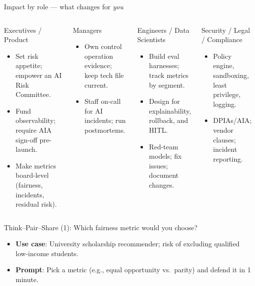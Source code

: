 \documentclass[11pt,aspectratio=169]{beamer}
\begin{document}
\begin{frame}{Impact by role — what changes for \emph{you}}
\begin{columns}[T,onlytextwidth]
\begin{block}{Executives / Product}
\begin{itemize}
  \item Set risk appetite; empower an AI Risk Committee.
  \item Fund observability; require AIA sign-off pre-launch.
  \item Make metrics board-level (fairness, incidents, residual risk).
\end{itemize}
\end{block}
\begin{block}{Managers}
\begin{itemize}
  \item Own control operation evidence; keep tech file current.
  \item Staff on-call for AI incidents; run postmortems.
\end{itemize}
\end{block}
\begin{block}{Engineers / Data Scientists}
\begin{itemize}
  \item Build eval harnesses; track metrics by segment.
  \item Design for explainability, rollback, and HITL.
  \item Red-team models; fix issues; document changes.
\end{itemize}
\end{block}
\begin{block}{Security / Legal / Compliance}
\begin{itemize}
  \item Policy engine, sandboxing, least privilege, logging.
  \item DPIAs/AIA; vendor clauses; incident reporting.
\end{itemize}
\end{block}
\end{columns}
\end{frame}

\begin{frame}{Think–Pair–Share (1): Which fairness metric would you choose?}
\begin{itemize}
  \item \textbf{Use case}: University scholarship recommender; risk of excluding qualified low-income students.
  \item \textbf{Prompt}: Pick a metric (e.g., equal opportunity vs.\ parity) and defend it in 1 minute.
\end{itemize}
\end{frame}
\end{document}
